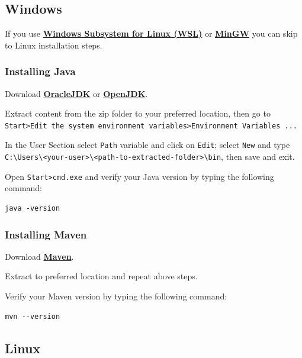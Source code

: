 \documentclass[table, 12pt]{article}
\begin{document}
\subsection{Windows}\label{windows}


If you use
\textbf{\href{https://docs.microsoft.com/en-us/windows/wsl/install-win10}{Windows
        Subsystem for Linux (WSL)}} or \textbf{\href{http://mingw-w64.org/doku.php}{MinGW}} you
can skip to Linux installation steps.

\subsubsection{Installing Java}\label{installing-java}

Download \textbf{\href{https://jdk.java.net/15/}{OracleJDK}} or \textbf{\href{https://openjdk.java.net/projects/jdk/15/}{OpenJDK}}.

Extract content from the zip folder to your preferred location, then go
to
\texttt{Start\textgreater{}Edit the system environment variables\textgreater{}Environment Variables ...}

In the User Section select \texttt{Path} variable and click on
\texttt{Edit}; select \texttt{New} and type
\texttt{C:\textbackslash{}Users\textbackslash{}\textless{}your-user\textgreater{}\textbackslash{}\textless{}path-to-extracted-folder\textgreater{}\textbackslash{}bin},
then save and exit.

Open \texttt{Start\textgreater{}cmd.exe} and verify your Java version by
typing the following command:

\begin{verbatim}
java -version
\end{verbatim}

\subsubsection{Installing Maven}\label{installing-maven}

Download
\textbf{\href{https://mirror.nohup.it/apache/maven/maven-3/3.6.3/binaries/apache-maven-3.6.3-bin.zip}{Maven}}.

Extract to preferred location and repeat above steps.

Verify your Maven version by typing the following command:

\begin{verbatim}
mvn --version
\end{verbatim}

\subsection{Linux}\label{linux}
\end{document}
